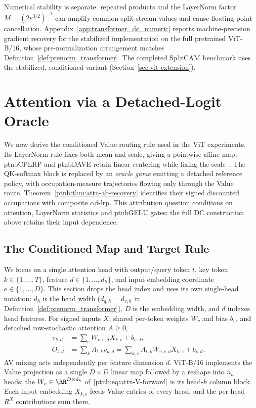Numerical stability is separate: repeated products and the LayerNorm factor $M=(2\varepsilon^{3/2})^{-1}$ can amplify common split-stream values and cause floating-point cancellation. Appendix~\ref{app:transformer_dc_numeric} reports machine-precision gradient recovery for the stabilized implementation on the full pretrained ViT-B/16, whose pre-normalization arrangement matches Definition~\ref{def:prenorm_transformer}. The completed SplitCAM benchmark uses the stabilized, conditioned variant (Section~\ref{sec:vit-extension}).

\section{Attention via a Detached-Logit Oracle}\label{ptnb:sec:attention}\label{ptnb:app:vit-extension}\label{sec:attention_routing_game}\label{ptnb:app:attention-subgame}\label{app:supp_attention}

We now derive the conditioned Value-routing rule used in the ViT experiments. Its LayerNorm rule fixes both mean and scale, giving a pointwise affine map; \ac{ptnbCPLRP} and \ac{ptnbDAVE} retain linear centering while fixing the scale~\parencite{Ali2022AttnLRP,Wrobel2024}. The QK-softmax block is replaced by an \emph{oracle game} emitting a detached reference policy, with occupation-measure trajectories flowing only through the Value route. Theorem~\ref{ptnb:thm:attn-ab-recovery} identifies their signed discounted occupations with composite $\alpha\beta$-\ac{lrp}. This attribution question conditions on attention, LayerNorm statistics and \acs{ptnbGELU} gates; the full DC construction above retains their input dependence.

\subsection{The Conditioned Map and Target Rule}\label{ptnb:app:attention-kl-routing}\label{ptnb:app:attention-target-rule}

We focus on a single attention head with output/query token $t$, key token $k\in\{1,\dots,T\}$, feature $d\in\{1,\dots,d_h\}$, and input embedding coordinate $e\in\{1,\dots,D\}$. This section drops the head index and uses its own single-head notation: $d_h$ is the head width ($d_{q,h}=d_{v,h}$ in Definition~\ref{def:prenorm_transformer}), $D$ is the embedding width, and $d$ indexes head features. For signed inputs $X$, shared per-token weights $W_v$ and bias $b_v$, and detached row-stochastic attention $A\ge0$,
\begin{align}
    v_{k,d}&=\sum_e W_{v,e,d}X_{k,e}+b_{v,d},\label{ptnb:eq:attn-V-forward}\\
    O_{t,d}&=\sum_k A_{t,k}v_{k,d}
      =\sum_{k,e}A_{t,k}W_{v,e,d}X_{k,e}+b_{v,d}.\label{ptnb:eq:attn-AV-forward}
\end{align}
AV mixing acts independently per feature dimension $d$. ViT-B/16 implements the Value projection as a single $D\times D$ linear map followed by a reshape into $n_h$ heads; the $W_v\in\RR^{D\times d_h}$ of~\eqref{ptnb:eq:attn-V-forward} is its head-$h$ column block. Each input embedding $X_{k,e}$ feeds Value entries of every head, and the per-head $R^X$ contributions sum there.

